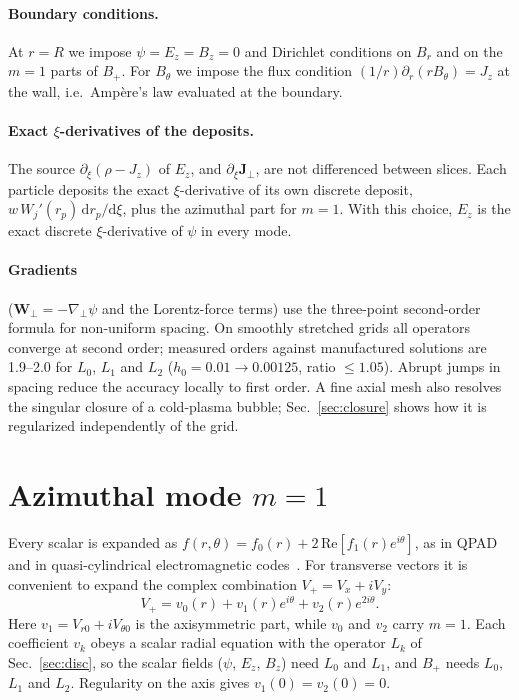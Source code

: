 \documentclass[aps,prab,reprint,floatfix,superscriptaddress,amsmath,amssymb]{revtex4-2}
\newcommand{\dd}{\mathrm{d}}
\begin{document}
\paragraph{Boundary conditions.} At $r=R$ we impose $\psi = E_z = B_z = 0$ and Dirichlet conditions on $B_r$ and on the $m=1$ parts of $B_+$. For $B_\theta$ we impose the flux condition $(1/r)\partial_r(rB_\theta) = J_z$ at the wall, i.e.\ Amp\`ere's law evaluated at the boundary.

\paragraph{Exact $\xi$-derivatives of the deposits.} The source $\partial_\xi(\rho - J_z)$ of $E_z$, and $\partial_\xi\bm{J}_\perp$, are not differenced between slices. Each particle deposits the exact $\xi$-derivative of its own discrete deposit, $w\,W_j'(r_p)\,\dd r_p/\dd\xi$, plus the azimuthal part for $m=1$. With this choice, $E_z$ is the exact discrete $\xi$-derivative of $\psi$ in every mode.

\paragraph{Gradients} ($\bm{W}_\perp = -\nabla_\perp\psi$ and the Lorentz-force terms) use the three-point second-order formula for non-uniform spacing. On smoothly stretched grids all operators converge at second order; measured orders against manufactured solutions are 1.9--2.0 for $L_0$, $L_1$ and $L_2$ ($h_0 = 0.01\to0.00125$, ratio $\le 1.05$). Abrupt jumps in spacing reduce the accuracy locally to first order. A fine axial mesh also resolves the singular closure of a cold-plasma bubble; Sec.~\ref{sec:closure} shows how it is regularized independently of the grid.

\section{Azimuthal mode $m=1$}\label{sec:m1}

Every scalar is expanded as $f(r,\theta) = f_0(r) + 2\,\mathrm{Re}[f_1(r)e^{i\theta}]$, as in QPAD~\cite{Li2021} and in quasi-cylindrical electromagnetic codes~\cite{Lifschitz2009}. For transverse vectors it is convenient to expand the complex combination $V_+ = V_x + iV_y$:
\begin{equation}
V_+ = v_0(r) + v_1(r)e^{i\theta} + v_2(r)e^{2i\theta}. \label{eq:vplus}
\end{equation}
Here $v_1 = V_{r0} + iV_{\theta0}$ is the axisymmetric part, while $v_0$ and $v_2$ carry $m=1$. Each coefficient $v_k$ obeys a scalar radial equation with the operator $L_k$ of Sec.~\ref{sec:disc}, so the scalar fields ($\psi$, $E_z$, $B_z$) need $L_0$ and $L_1$, and $B_+$ needs $L_0$, $L_1$ and $L_2$. Regularity on the axis gives $v_1(0) = v_2(0) = 0$.
\end{document}
